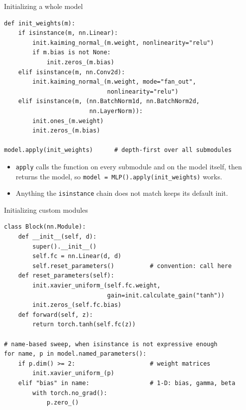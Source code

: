 \documentclass[10pt,aspectratio=169]{beamer}
\begin{document}
\begin{frame}[fragile]{Initializing a whole model}
\begin{lstlisting}
def init_weights(m):
    if isinstance(m, nn.Linear):
        init.kaiming_normal_(m.weight, nonlinearity="relu")
        if m.bias is not None:
            init.zeros_(m.bias)
    elif isinstance(m, nn.Conv2d):
        init.kaiming_normal_(m.weight, mode="fan_out",
                             nonlinearity="relu")
    elif isinstance(m, (nn.BatchNorm1d, nn.BatchNorm2d,
                        nn.LayerNorm)):
        init.ones_(m.weight)
        init.zeros_(m.bias)

model.apply(init_weights)      # depth-first over all submodules
\end{lstlisting}
\begin{itemize}
    \item \texttt{apply} calls the function on every submodule and on the model itself, then returns
          the model, so \texttt{model = MLP().apply(init\_weights)} works.
    \item Anything the \texttt{isinstance} chain does not match keeps its default init.
\end{itemize}
\end{frame}

\begin{frame}[fragile]{Initializing custom modules}
\begin{lstlisting}
class Block(nn.Module):
    def __init__(self, d):
        super().__init__()
        self.fc = nn.Linear(d, d)
        self.reset_parameters()          # convention: call here
    def reset_parameters(self):
        init.xavier_uniform_(self.fc.weight,
                             gain=init.calculate_gain("tanh"))
        init.zeros_(self.fc.bias)
    def forward(self, z):
        return torch.tanh(self.fc(z))

# name-based sweep, when isinstance is not expressive enough
for name, p in model.named_parameters():
    if p.dim() >= 2:                     # weight matrices
        init.xavier_uniform_(p)
    elif "bias" in name:                 # 1-D: bias, gamma, beta
        with torch.no_grad():
            p.zero_()
\end{lstlisting}
\end{frame}

\end{document}
